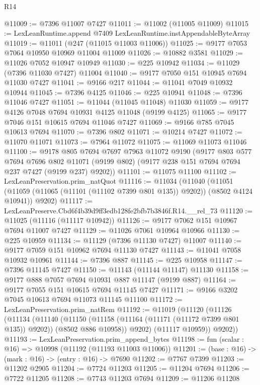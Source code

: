 \begin{lexlean}{R14}
\begin{coremodule}
@11009 := @7396 @11007 @7427
@11011 := @11002 (@11005 @11009)
@11015 := LexLeanRuntime.append @7409 LexLeanRuntime.instAppendableByteArray
@11019 := @11011 (@247 (@11015 @11003 @11006))
@11025 := @9177 @7053 @7064 @10950 @10969 @11004 @11009
@11026 := @10882 @3581
@11029 := @11026 @7052 @10947 @10949
@11030 := @225 @10942
@11034 := @11029 (@7396 @11030 @7427) @11004
@11040 := @9177 @7050 @151 @10945 @7694 @11030 @7427
@11041 := @9166 @217
@11044 := @11041 @7049 @10932 @10944
@11045 := @7396 @4125
@11046 := @225 @10941
@11048 := @7396 @11046 @7427
@11051 := @11044 (@11045 @11048) @11030
@11059 := @9177 @4126 @7048 @7694 @10931 @4125 @11048 (@9199 @4125)
@11065 := @9177 @7046 @151 @10615 @7694 @11046 @7427
@11069 := @9166 @785 @7045 @10613 @7694
@11070 := @7396 @802
@11071 := @10214 @7427
@11072 := @11070 @11071
@11073 := @7964 @11072
@11075 := @11069 @11073 @11046
@11100 := @9178
    @805
    @7694
    @7697
    @7963
    @11072
    @9190
    (@9177
      @803
      @577
      @7694
      @7696
      @802
      @11071
      (@9199 @802)
      (@9177 @238 @151 @7694 @7694 @237 @7427 (@9199 @237) @9202))
@11101 := @11075 @11100
@11102 := LexLeanPreservation.prim_natQuot
@11116 := @11034
    (@11040
      (@11051 (@11059 (@11065 (@11101 (@11102 @7399 @801 @135)) @9202)) (@8502 @4124 @10941))
      @9202)
@11117 := LexLeanPreserve.Cbd6f4b39d9ff3edb128fe2bfb7b3846f.R14.__rel_73
@11120 := @11025 (@11116 (@11117 @10942))
@11126 := @9177 @7062 @151 @10967 @7694 @11007 @7427
@11129 := @11026 @7061 @10964 @10966
@11130 := @225 @10959
@11134 := @11129 (@7396 @11130 @7427) @11007
@11140 := @9177 @7059 @151 @10962 @7694 @11130 @7427
@11143 := @11041 @7058 @10932 @10961
@11144 := @7396 @887
@11145 := @225 @10958
@11147 := @7396 @11145 @7427
@11150 := @11143 (@11144 @11147) @11130
@11158 := @9177 @888 @7057 @7694 @10931 @887 @11147 (@9199 @887)
@11164 := @9177 @7055 @151 @10615 @7694 @11145 @7427
@11171 := @9166 @3202 @7045 @10613 @7694 @11073 @11145 @11100
@11172 := LexLeanPreservation.prim_natRem
@11192 := @11019
    (@11120
      (@11126
        (@11134
          (@11140
            (@11150 (@11158 (@11164 (@11171 (@11172 @7399 @801 @135)) @9202)) (@8502 @886 @10958))
            @9202)
          (@11117 @10959))
        @9202))
@11193 := LexLeanPreservation.prim_append_bytes
@11198 := fun (scalar : @16) => @10998 (@11192 (@11193 @11003 @11006))
@11201 := (base : @16) -> (mark : @16) -> (entry : @16) -> @7690
@11202 := @7767 @7399
@11203 := @11202 @2905
@11204 := @7724 @11203
@11205 := @11204 @7694
@11206 := @7722 @11205
@11208 := @7743 @11203 @7694
@11209 := @11206 @11208

\end{coremodule}
\end{lexlean}
